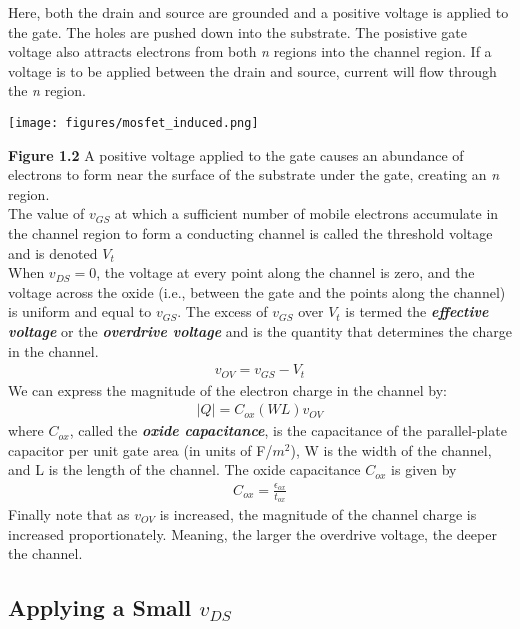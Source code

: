 \documentclass[12pt]{article}
\begin{document}
    Here, both the drain and source are grounded and a positive voltage 
    is applied to the gate. The holes are pushed down into the substrate. The
    posistive gate voltage also attracts electrons from both \textit{n} 
    regions into the channel region. If a voltage is to be applied between 
    the drain and source, current will flow through the \textit{n} region.
    \begin{center}
        \texttt{[image: figures/mosfet\_induced.png]}
    \end{center}
    \textbf{Figure 1.2} A positive voltage applied to the gate 
    causes an abundance of electrons to form near the surface 
    of the substrate under the gate, creating an \textit{n} region.\\[\baselineskip]
    The value of $v_{GS}$ at which a sufficient number of mobile electrons 
    accumulate in the channel region to form a conducting channel is called 
    the threshold voltage and is denoted $V_t$\\
    When $v_{DS} = 0$, the voltage at every point along the channel is zero, 
    and the voltage across the oxide (i.e., between the gate and the points along 
    the channel) is uniform and equal to $v_{GS}$. The excess of $v_{GS}$ over $V_t$ is
    termed the \textit{\textbf{effective voltage}} or the \textit{\textbf{overdrive voltage}} 
    and is the quantity that determines the charge in the channel.
    \begin{align}
        v_{OV} = v_{GS} - V_t
    \end{align}
    We can express the magnitude of the electron charge in the channel by:
    \begin{align}
        |Q| = C_{ox}(WL)v_{OV}
    \end{align}
    where $C_{ox}$, called the \textit{\textbf{oxide capacitance}}, is the capacitance of the 
    parallel-plate capacitor per unit gate area (in units of F/$m^2$), W is the width of the channel, 
    and L is the length of the channel. The oxide capacitance $C_{ox}$ is given by
    \begin{align}
        C_{ox} = \frac{\epsilon_{ox}}{t_{ox}}
    \end{align}
    Finally note that as $v_{OV}$ is increased, the magnitude of the channel charge is 
    increased proportionately. Meaning, the larger the overdrive voltage, the
    deeper the channel.

    \subsection*{Applying a Small $v_{DS}$}
\end{document}
